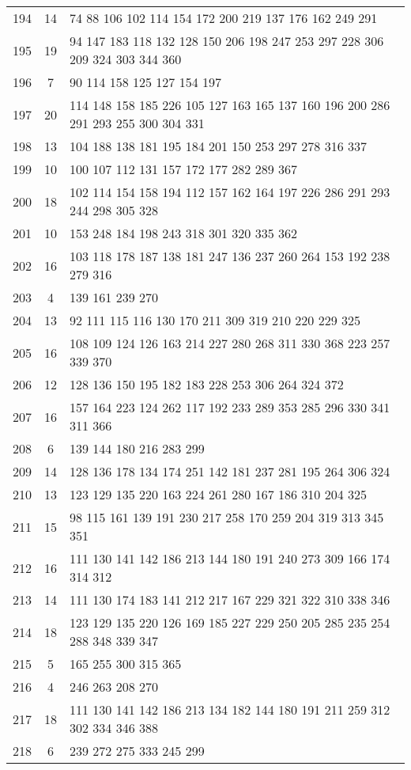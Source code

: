 \documentclass{standalone}
\begin{document}
\begin{tabular}{c c l}
194 & 14 & 74 88 106 102 114 154 172 200 219 137 176 162 249 291 \\
195 & 19 & 94 147 183 118 132 128 150 206 198 247 253 297 228 306 209 324 303 344 360 \\
196 & 7 & 90 114 158 125 127 154 197 \\
197 & 20 & 114 148 158 185 226 105 127 163 165 137 160 196 200 286 291 293 255 300 304 331 \\
198 & 13 & 104 188 138 181 195 184 201 150 253 297 278 316 337 \\
199 & 10 & 100 107 112 131 157 172 177 282 289 367 \\
200 & 18 & 102 114 154 158 194 112 157 162 164 197 226 286 291 293 244 298 305 328 \\
201 & 10 & 153 248 184 198 243 318 301 320 335 362 \\
202 & 16 & 103 118 178 187 138 181 247 136 237 260 264 153 192 238 279 316 \\
203 & 4 & 139 161 239 270 \\
204 & 13 & 92 111 115 116 130 170 211 309 319 210 220 229 325 \\
205 & 16 & 108 109 124 126 163 214 227 280 268 311 330 368 223 257 339 370 \\
206 & 12 & 128 136 150 195 182 183 228 253 306 264 324 372 \\
207 & 16 & 157 164 223 124 262 117 192 233 289 353 285 296 330 341 311 366 \\
208 & 6 & 139 144 180 216 283 299 \\
209 & 14 & 128 136 178 134 174 251 142 181 237 281 195 264 306 324 \\
210 & 13 & 123 129 135 220 163 224 261 280 167 186 310 204 325 \\
211 & 15 & 98 115 161 139 191 230 217 258 170 259 204 319 313 345 351 \\
212 & 16 & 111 130 141 142 186 213 144 180 191 240 273 309 166 174 314 312 \\
213 & 14 & 111 130 174 183 141 212 217 167 229 321 322 310 338 346 \\
214 & 18 & 123 129 135 220 126 169 185 227 229 250 205 285 235 254 288 348 339 347 \\
215 & 5 & 165 255 300 315 365 \\
216 & 4 & 246 263 208 270 \\
217 & 18 & 111 130 141 142 186 213 134 182 144 180 191 211 259 312 302 334 346 388 \\
218 & 6 & 239 272 275 333 245 299 \\

\end{tabular}
\end{document}
